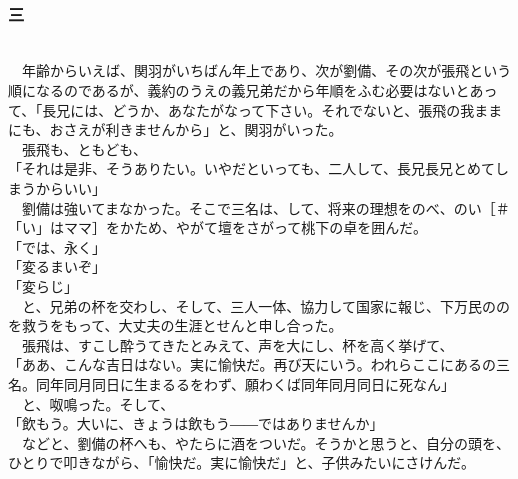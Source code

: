 \documentclass[
  paper=a5,
  fontsize=10pt,
  jafontsize=9.5pt,
  tate,                  %
  open_bracket_pos=nibu, %
]{jlreq}
\begin{document}
\\

\subsubsection{三}

\\


　年齢からいえば、関羽がいちばん年上であり、次が劉備、その次が張飛という順になるのであるが、義約のうえの義兄弟だから年順をふむ必要はないとあって、「長兄には、どうか、あなたがなって下さい。それでないと、張飛の我ままにも、おさえが利きませんから」と、関羽がいった。\\


　張飛も、ともども、\\


「それは是非、そうありたい。いやだといっても、二人して、長兄長兄とめてしまうからいい」\\


　劉備は強いてまなかった。そこで三名は、して、将来の理想をのべ、のい［＃「い」はママ］をかため、やがて壇をさがって桃下の卓を囲んだ。\\


「では、永く」\\


「変るまいぞ」\\


「変らじ」\\


　と、兄弟の杯を交わし、そして、三人一体、協力して国家に報じ、下万民ののを救うをもって、大丈夫の生涯とせんと申し合った。\\


　張飛は、すこし酔うてきたとみえて、声を大にし、杯を高く挙げて、\\


「ああ、こんな吉日はない。実に愉快だ。再び天にいう。われらここにあるの三名。同年同月同日に生まるるをわず、願わくば同年同月同日に死なん」\\


　と、呶鳴った。そして、\\


「飲もう。大いに、きょうは飲もう――ではありませんか」\\


　などと、劉備の杯へも、やたらに酒をついだ。そうかと思うと、自分の頭を、ひとりで叩きながら、「愉快だ。実に愉快だ」と、子供みたいにさけんだ。\\
\end{document}
